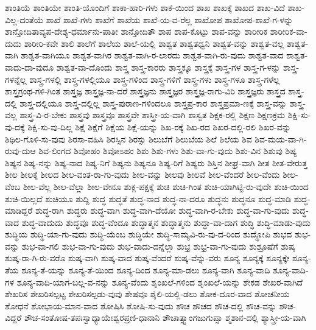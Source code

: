 {ಶಾಂತಿಯೆ
ಶಾಂತಿಯೇ
ಶಾಂತಿ-ಯೊಂದಿಗೆ
ಶಾಕಾ-ಹಾರಿ-ಗಳು
ಶಾಕೆ-ಯಿಂದ
ಶಾಖ
ಶಾಖಕ್ಕೆ
ಶಾಖದ
ಶಾಖ-ವಿದೆ
ಶಾಖ-ವಿಲ್ಲ-ದಂತೆಯೆ
ಶಾಖೆ
ಶಾಖೆ-ಗಳು
ಶಾಖೆಗೆ
ಶಾಖೆಯ
ಶಾಖೆ-ಯ-ವ-ರೆಲ್ಲ
ಶಾಖೋಪ
ಶಾಖೋಪ-ಶಾಖೆ-ಗ-ಳನ್ನು
ಶಾನ್ತೋದಿತಾವ್ಯಪ-ದೇಶ್ಯ-ಧರ್ಮಾನು-ಪಾತೀ
ಶಾನ್ತೋದಿತೌ
ಶಾಪ
ಶಾಪ-ಕೊಟ್ಟು
ಶಾಪ-ವನ್ನು
ಶಾರೀರಿಕ
ಶಾರೀರಿಕ-ವಾ-ದುದು
ಶಾರೀರಿ-ಕವೇ
ಶಾಲಿ
ಶಾಲೆಗೆ
ಶಾಲೆಯ
ಶಾಲೆ-ಯಲ್ಲಿ
ಶಾಶ್ವತ
ಶಾಶ್ವತಧ್ವನಿ
ಶಾಶ್ವತ-ವನ್ನು
ಶಾಶ್ವತ-ವಲ್ಲ
ಶಾಶ್ವತ-ವಾಗಿ
ಶಾಶ್ವತ-ವಾಗಿಯೂ
ಶಾಶ್ವತ-ವಾಗಿರ
ಶಾಶ್ವತ-ವಾಗಿ-ರ-ಲಾರದು
ಶಾಶ್ವತ-ವಾಗಿ-ರು-ವುದು
ಶಾಶ್ವತ-ವಾದ
ಶಾಶ್ವತ-ವಾದು-ದಾ-ವುದೂ
ಶಾಶ್ವತ-ವಾ-ದೊಂದು
ಶಾಸ್ತ್ರ
ಶಾಸ್ತ್ರ-ಕಾರರು
ಶಾಸ್ತ್ರಕ್ಕೂ
ಶಾಸ್ತ್ರಕ್ಕೆ
ಶಾಸ್ತ್ರ-ಗಳ
ಶಾಸ್ತ್ರ-ಗ-ಳನ್ನು
ಶಾಸ್ತ್ರ-ಗಳನ್ನೆಲ್ಲ
ಶಾಸ್ತ್ರ-ಗಳಲ್ಲಿ
ಶಾಸ್ತ್ರ-ಗಳಲ್ಲಿಯೂ
ಶಾಸ್ತ್ರ-ಗಳಿಂದ
ಶಾಸ್ತ್ರ-ಗಳಿಗೆ
ಶಾಸ್ತ್ರ-ಗಳು
ಶಾಸ್ತ್ರ-ಗಳೂ
ಶಾಸ್ತ್ರ-ಗಳೆಲ್ಲ
ಶಾಸ್ತ್ರಗ್ರಂಥ-ಗಳಿ-ಗಿಂತ
ಶಾಸ್ತ್ರಜ್ಞ
ಶಾಸ್ತ್ರಜ್ಞ-ನಾ-ದರೆ
ಶಾಸ್ತ್ರಜ್ಞನು
ಶಾಸ್ತ್ರಜ್ಞರ
ಶಾಸ್ತ್ರಜ್ಞ-ರಾಗು-ವಿರಿ
ಶಾಸ್ತ್ರಜ್ಞರು
ಶಾಸ್ತ್ರದ
ಶಾಸ್ತ್ರ-ದಲ್ಲಿ
ಶಾಸ್ತ್ರ-ದಲ್ಲಿಯೂ
ಶಾಸ್ತ್ರ-ದಲ್ಲಿಲ್ಲ
ಶಾಸ್ತ್ರ-ಪುರಾಣ-ಗಳಿಂದಲೂ
ಶಾಸ್ತ್ರಪ್ರ-ಕಾರ
ಶಾಸ್ತ್ರಪ್ರಮಾ-ಣಕ್ಕೆ
ಶಾಸ್ತ್ರ-ವನ್ನು
ಶಾಸ್ತ್ರ-ವಲ್ಲ
ಶಾಸ್ತ್ರ-ವಿ-ರ-ಬೇಕು
ಶಾಸ್ತ್ರವು
ಶಾಸ್ತ್ರವೂ
ಶಾಸ್ತ್ರವೇ
ಶಾಸ್ತ್ರೀ-ಯ-ವಾಗಿ
ಶಾಸ್ವತ
ಶಿಕ್ಷಕ-ರಲ್ಲಿ
ಶಿಕ್ಷಣ
ಶಿಕ್ಷಣಕ್ರಮ
ಶಿಕ್ಷಿ-ಸು-ವು-ದಕ್ಕೆ
ಶಿಕ್ಷಿ-ಸು-ವು-ದಿಲ್ಲ
ಶಿಕ್ಷೆ
ಶಿಕ್ಷೆಗೆ
ಶಿಕ್ಷೆಯ
ಶಿಕ್ಷೆ-ಯನ್ನು
ಶಿಖ-ರಕ್ಕೆ
ಶಿಖ-ರದ
ಶಿಖರ-ದಲ್ಲಿ-ರಲಿ
ಶಿಖರ-ವನ್ನು
ಶಿಥಿಲ-ಗೊಳಿ-ಸು-ವುವು
ಶಿರಸಾ-ವಹಿಸಿ
ಶಿರಸ್ಸಿನ
ಶಿರಸ್ಸು
ಶಿಲುಬೆಗೆ
ಶಿಲುಬೆಯ
ಶಿಲೆ
ಶಿಲೆಯ
ಶಿವ
ಶಿವ-ಮಯ-ವಾ-ಗಿ-ರುವು-ದುಆ
ಶಿವ-ಲಿಂಗದ
ಶಿವೋಹಂ
ಶಿವೋಽಹಂ
ಶಿಶು
ಶಿಶು-ಗಳು
ಶಿಶು-ವಾ-ಗು-ವುದು
ಶಿಶು-ವಿನ
ಶಿಶುವು
ಶಿಷ್ಯ
ಶಿಷ್ಯನ
ಶಿಷ್ಯ-ನನ್ನು
ಶಿಷ್ಯ-ನಾದ
ಶಿಷ್ಯ-ನಿಗೆ
ಶಿಷ್ಯನು
ಶಿಷ್ಯನೂ
ಶಿಷ್ಯ-ರಿಗೆ
ಶಿಷ್ಯರು
ಶಿಸ್ತಿನ
ಶೀಘ್ರ-ವಾಗಿ
ಶೀತ
ಶೀತ-ವೇರುತ್ತ
ಶೀಲ
ಶೀಲಕ್ಕೆ
ಶೀಲದ
ಶೀಲ-ವಂತ-ರಾ-ಗು-ವುದು
ಶೀಲ-ವನ್ನು
ಶೀಲವು
ಶೀಲವೆ
ಶೀಲ-ವೆಂದರೆ
ಶೀಲ-ವೆಂದು
ಶೀಲ-ವೆಂಬ
ಶೀಲ-ವೆಲ್ಲ
ಶೀಲ-ವೆಲ್ಲಾ
ಶೀಲ-ವೇನೂ
ಶುಕ್ಲ-ಪಕ್ಷಕ್ಕೆ
ಶುಚಿ
ಶುಚಿ-ಗಿಂತ
ಶುಚಿ-ಯಾಗಿಟ್ಟಿ-ರು-ವುದೇ
ಶುಚಿ-ಯಿಂದ
ಶುಚಿ-ಯಿಲ್ಲದೆ
ಶುಚಿಯೂ
ಶುದ್ದಿ
ಶುದ್ಧ
ಶುದ್ಧತೆ
ಶುದ್ಧ-ನಾದ
ಶುದ್ಧ-ನಾ-ದರೂ
ಶುದ್ಧನು
ಶುದ್ಧನೂ
ಶುದ್ಧ-ಮಾಡಿ
ಶುದ್ಧ-ಮಾಡಿದ್ದರೆ
ಶುದ್ಧ-ರಾಗಿ
ಶುದ್ಧರು
ಶುದ್ಧ-ವಾಗಿ
ಶುದ್ಧ-ವಾಗಿ-ದೆಯೋ
ಶುದ್ಧ-ವಾಗಿ-ರ-ಬೇಕು
ಶುದ್ಧ-ವಾ-ಗು-ವುದು
ಶುದ್ಧ-ವಾದ
ಶುದ್ಧ-ವಾದುದು
ಶುದ್ಧವೂ
ಶುದ್ಧ-ವೆಂದೂ
ಶುದ್ಧಾತ್ಮನ
ಶುದ್ಧಾತ್ಮನು
ಶುದ್ಧಾ-ವಾ-ದಾಗ
ಶುದ್ಧಿ
ಶುದ್ಧಿ-ಮಾಡು-ವುದು
ಶುದ್ಧಿಯ
ಶುದ್ಧಿ-ಯಾ-ಗು-ವುದು
ಶುದ್ಧಿ-ಯೆಂಬ
ಶುದ್ಧಿಯೇ
ಶುದ್ಧಿ-ಸಾಮ್ಯವಿ-ರು-ವು-ದ-ರಿಂದ
ಶುದ್ಧೋಪಿ
ಶುಭದ
ಶುಭ-ವನ್ನು
ಶುಭ-ವಾ-ಗಲಿ
ಶುಭ-ವಾ-ಗು-ವುದು
ಶುಭ-ವಾದು-ದನ್ನೆಲ್ಲಾ
ಶುಭ್ರ
ಶುಭ್ರ-ವಾ-ಗು-ವುದು
ಶುಶ್ರೂಷೆಗೆ
ಶುಷ್ಕ
ಶುಷ್ಕ-ರಾ-ಗಿ-ರು-ವರೊ
ಶುಷ್ಕ-ವಾಗಿ
ಶುಷ್ಕ-ವಾದ
ಶುಷ್ಕ-ವೆಂದರೆ
ಶುಷ್ಕ-ವೆನ್ನು-ವರು
ಶೂನ್ಯ
ಶೂನ್ಯಕ್ಕೆ
ಶೂನ್ಯಕ್ಕೇ
ಶೂನ್ಯ-ತೆಯ
ಶೂನ್ಯ-ತೆ-ಯನ್ನು
ಶೂನ್ಯ-ತೆ-ಯಿಂದ
ಶೂನ್ಯ-ದಿಂದ
ಶೂನ್ಯ-ಮಾ-ಡಲು
ಶೂನ್ಯ-ವಾಗಿ
ಶೂನ್ಯ-ವಾದಿ
ಶೂನ್ಯ-ವಾದಿ-ಗಳ
ಶೂನ್ಯ-ವಾದಿ-ಯಾಗ-ಬಲ್ಲ-ವ-ನನ್ನು
ಶೂನ್ಯ-ವೆಂದು
ಶೃಂಖಲೆ-ಗಳಿಂದ
ಶೃಂಖಲೆ-ಯನ್ನು
ಶೇಕಡ
ಶೇಖರ-ವಾಗಿದೆ
ಶೇಖರಿಸ
ಶೇಖರಿಸಲ್ಪಟ್ಟ
ಶೇಖರಿಸಲ್ಪಡು-ವುವು
ಶೇಷವೂ
ಶೈಲಿ-ಯಲ್ಲಿ-ಡಲು
ಶೋಕ-ದೂರ-ವಾದ
ಶೋಚನೀಯ
ಶೋಧನೆ
ಶೋಭಾಯ-ಮಾನ-ವಾದ
ಶೋಷಿಸಿ
ಶೋಷಿ-ಸು-ವುದು
ಶೌಚ
ಶೌಚದ
ಶೌಚ-ದಲ್ಲಿ
ಶೌಚ-ವನ್ನು
ಶೌಚ-ವಿದ್ದರೆ
ಶೌಚ-ಸಂತೋಷ-ತಪಃಸ್ವಾಧ್ಯಾಯೇಶ್ವರಪ್ರಣಿ-ಧಾನಾನಿ
ಶೌಚಾತ್ಸ್ವಾಂಗಜುಗುಪ್ಸಾ
ಶ್ಮಶಾನ-ದಲ್ಲಿ
ಶ್ಯಾಸ್ತ್ರೀ-ಯ-ವಾಗಿ
}
